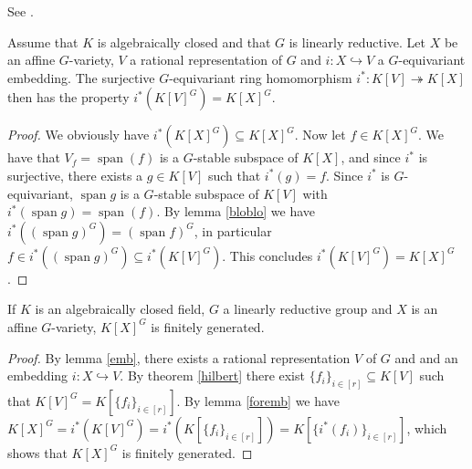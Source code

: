 \begin{lemma}\label{foremb}
  See \cite[2.2.9]{DK15}.
  
  Assume that $K$ is algebraically closed and that $G$ is linearly reductive.
  Let $X$ be an affine $G$-variety, $V$ a rational representation of $G$ and $i \colon X \hookrightarrow V$ a $G$-equivariant embedding.
  The surjective $G$-equivariant ring homomorphism $i^\ast \colon K[V] \twoheadrightarrow K[X]$ then has the property $i^\ast (K[V]^G) = K[X]^G$.
\end{lemma}

\begin{proof}
  We obviously have $i^\ast(K[X]^G) \subseteq K[X]^G$.
  Now let $f \in K[X]^G$.
  We have that $V_f = \operatorname{span}(f)$ is a $G$-stable subspace of $K[X]$, and since $i^\ast$ is surjective, there exists a $g\in K[V]$ such that $i^\ast(g) = f$.
  Since $i^\ast$ is $G$-equivariant, $\operatorname{span}g$ is a $G$-stable subspace of $K[V]$ with $i^\ast(\operatorname{span}g) = \operatorname{span}(f)$.
  By lemma \ref{bloblo} we have $i^\ast ((\operatorname{span}g)^G) = (\operatorname{span}f)^G$, in particular $f \in i^\ast ((\operatorname{span}g)^G) \subseteq i^\ast(K[V]^G)$.
  This concludes $i^\ast(K[V]^G) = K[X]^G$.
\end{proof}

\begin{theorem}
  If $K$ is an algebraically closed field, $G$ a linearly reductive group and $X$ is an affine $G$-variety, $K[X]^G$ is finitely generated.
\end{theorem}

\begin{proof}
  By lemma \ref{emb}, there exists a rational representation $V$ of $G$ and and an embedding $i \colon X \hookrightarrow V$.
  By theorem \ref{hilbert} there exist $ \{f_i\}_{i \in [r]} \subseteq K[V]$ such that $K[V]^G = K[\{f_i\}_{i \in [r]}]$.
  By lemma \ref{foremb} we have $K[X]^G = i^\ast (K[V]^G) = i^\ast (K[\{f_i\}_{i \in [r]}]) = K[\{i^\ast(f_i)\}_{i \in [r]}]$, which shows that $K[X]^G$ is finitely generated.
\end{proof}

